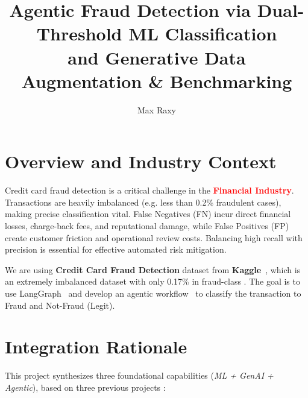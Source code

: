 \documentclass[stu, 12pt, floatsintext]{apa7}
\title{Agentic Fraud Detection via Dual-Threshold ML Classification\\and Generative Data Augmentation \& Benchmarking}
\author{Max Raxy}
\affiliation{Udacity Institute of AI \& Technology}
\begin{document}
	\maketitle
	\tableofcontents
	\newpage
	\listoffigures%
	\listoftables%
	\newpage

\section{Overview and Industry Context}
Credit card fraud detection is a critical challenge in the \textcolor{red}{\textbf{Financial Industry}}. Transactions are heavily imbalanced (e.g. less than 0.2\% fraudulent cases), making precise classification vital. False Negatives (FN) incur direct financial losses, charge-back fees, and reputational damage, while False Positives (FP) create customer friction and operational review costs. Balancing high recall with precision is essential for effective automated risk mitigation.

We are using \textbf{Credit Card Fraud Detection} dataset from \textbf{Kaggle}~\parencite{creditcardfraud}, which is an extremely imbalanced dataset with only 0.17\% in fraud-class . The goal is to use LangGraph~\parencite{langgraph_overview_2026} and develop an agentic workflow~\parencites{agentic_Plaat_2025}{agentic_Hughes04072025} to classify the transaction to Fraud and Not-Fraud (Legit). 

\section{Integration Rationale}
This project synthesizes three foundational capabilities (\textit{ML + GenAI + Agentic}), based on three previous projects :
\end{document}
